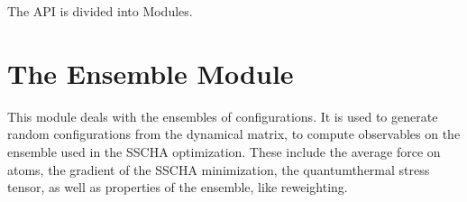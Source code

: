 \documentclass[a4paper,11pt,english]{sphinxmanual}
\begin{document}
\sphinxAtStartPar
The API is divided into Modules.


\section{The Ensemble Module}
\label{\detokenize{apireference:the-ensemble-module}}
\sphinxAtStartPar
This module deals with the ensembles of configurations.
It is used to generate random configurations from the dynamical matrix, to compute observables on the ensemble used in the SSCHA optimization.
These include the average force on atoms, the gradient of the SSCHA minimization, the quantum\sphinxhyphen{}thermal stress tensor, as well as properties of
the ensemble, like reweighting.
\end{document}
